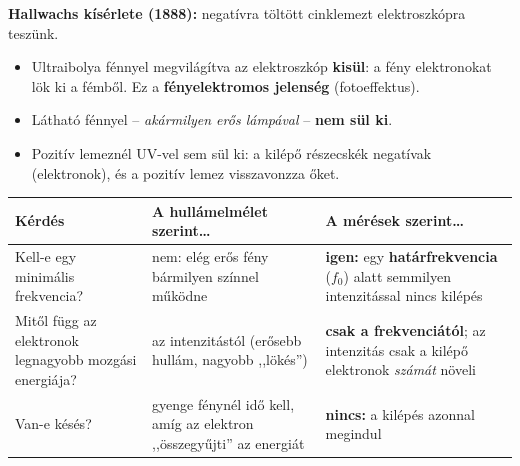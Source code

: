 \documentclass[12pt]{article}
\begin{document}
\begin{minipage}[t]{0.68\linewidth}\vspace{0pt}
\textbf{Hallwachs kísérlete (1888):} negatívra töltött cinklemezt elektroszkópra teszünk.
\begin{itemize}
  \item Ultraibolya fénnyel megvilágítva az elektroszkóp \textbf{kisül}: a fény
    elektronokat lök ki a fémből. Ez a \textbf{fényelektromos jelenség} (fotoeffektus).
  \item Látható fénnyel -- \emph{akármilyen erős lámpával} -- \textbf{nem sül ki}.
  \item Pozitív lemeznél UV-vel sem sül ki: a kilépő részecskék negatívak (elektronok),
    és a pozitív lemez visszavonzza őket.
\end{itemize}
\end{minipage}\hfill
\begin{minipage}[t]{0.28\linewidth}\vspace{0pt}\centering
{}
\end{minipage}

\vspace{6pt}
\begin{center}
\renewcommand{\arraystretch}{1.45}
\begin{tabular}{|>{\raggedright\arraybackslash}p{5.2cm}|>{\raggedright\arraybackslash}p{6.6cm}|>{\raggedright\arraybackslash}p{8.2cm}|}
\hline
\textbf{Kérdés} & \textbf{A hullámelmélet szerint\dots} & \textbf{A mérések szerint\dots} \\ \hline
Kell-e egy minimális frekvencia? & nem: elég erős fény bármilyen színnel működne
  & \textbf{igen:} egy \textbf{határfrekvencia} ($f_0$) alatt semmilyen intenzitással nincs kilépés \\ \hline
Mitől függ az elektronok legnagyobb mozgási energiája? & az intenzitástól (erősebb hullám,
  nagyobb ,,lökés'') & \textbf{csak a frekvenciától}; az intenzitás csak a kilépő
  elektronok \emph{számát} növeli \\ \hline
Van-e késés? & gyenge fénynél idő kell, amíg az elektron ,,összegyűjti'' az energiát
  & \textbf{nincs:} a kilépés azonnal megindul \\ \hline
\end{tabular}
\end{center}
\end{document}
